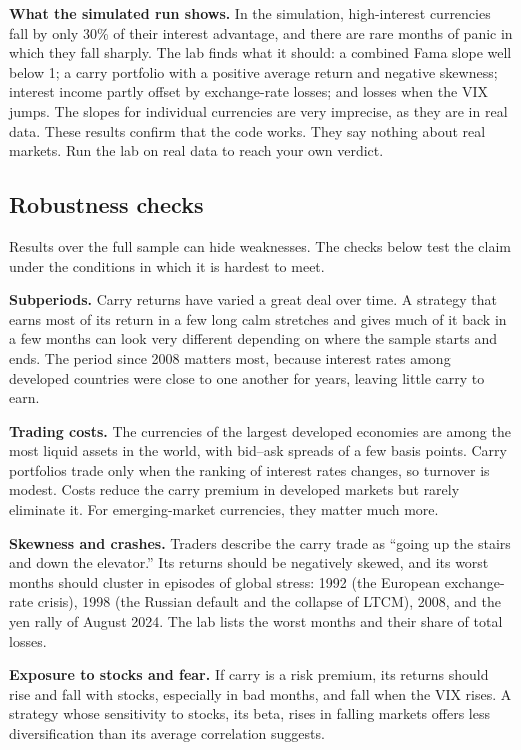 \textbf{What the simulated run shows.} In the simulation, high-interest currencies fall by only 30\% of their interest advantage, and there are rare months of panic in which they fall sharply. The lab finds what it should: a combined Fama slope well below 1; a carry portfolio with a positive average return and negative skewness; interest income partly offset by exchange-rate losses; and losses when the VIX jumps. The slopes for individual currencies are very imprecise, as they are in real data. These results confirm that the code works. They say nothing about real markets. Run the lab on real data to reach your own verdict.

\subsection{Robustness checks}
\label{sec:06-stress}

Results over the full sample can hide weaknesses. The checks below test the claim under the conditions in which it is hardest to meet.

\textbf{Subperiods.} Carry returns have varied a great deal over time. A strategy that earns most of its return in a few long calm stretches and gives much of it back in a few months can look very different depending on where the sample starts and ends. The period since 2008 matters most, because interest rates among developed countries were close to one another for years, leaving little carry to earn.

\textbf{Trading costs.} The currencies of the largest developed economies are among the most liquid assets in the world, with bid--ask spreads of a few basis points. Carry portfolios trade only when the ranking of interest rates changes, so turnover is modest. Costs reduce the carry premium in developed markets but rarely eliminate it. For emerging-market currencies, they matter much more.

\textbf{Skewness and crashes.} Traders describe the carry trade as ``going up the stairs and down the elevator.'' Its returns should be negatively skewed, and its worst months should cluster in episodes of global stress: 1992 (the European exchange-rate crisis), 1998 (the Russian default and the collapse of LTCM), 2008, and the yen rally of August 2024. The lab lists the worst months and their share of total losses.

\textbf{Exposure to stocks and fear.} If carry is a risk premium, its returns should rise and fall with stocks, especially in bad months, and fall when the VIX rises. A strategy whose sensitivity to stocks, its beta, rises in falling markets offers less diversification than its average correlation suggests.

